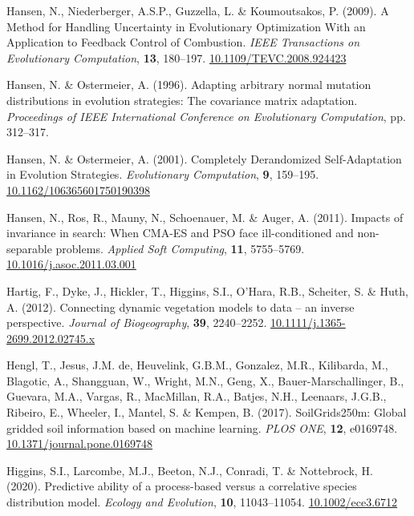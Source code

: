 \documentclass[11pt,]{article}
\newlength{\cslhangindent}
\newenvironment{CSLReferences}[2] %
 {%
  \setlength{\parindent}{0pt}
  \ifodd #1 \everypar{\setlength{\hangindent}{\cslhangindent}}\ignorespaces\fi
  \ifnum #2 > 0
  \setlength{\parskip}{#2\baselineskip}
  \fi
 }%
 {}
\begin{document}
\begin{CSLReferences}{1}{0}
\leavevmode{}%
Hansen, N., Niederberger, A.S.P., Guzzella, L. \& Koumoutsakos, P.
(2009). A {Method} for {Handling} {Uncertainty} in {Evolutionary}
{Optimization} {With} an {Application} to {Feedback} {Control} of
{Combustion}. \emph{IEEE Transactions on Evolutionary Computation},
\textbf{13}, 180--197.
\href{https://doi.org/10.1109/TEVC.2008.924423}{10.1109/TEVC.2008.924423}

\leavevmode{}%
Hansen, N. \& Ostermeier, A. (1996). Adapting arbitrary normal mutation
distributions in evolution strategies: The covariance matrix adaptation.
\emph{Proceedings of {IEEE} {International} {Conference} on
{Evolutionary} {Computation}}, pp. 312--317.

\leavevmode{}%
Hansen, N. \& Ostermeier, A. (2001). Completely {Derandomized}
{Self}-{Adaptation} in {Evolution} {Strategies}. \emph{Evolutionary
Computation}, \textbf{9}, 159--195.
\href{https://doi.org/10.1162/106365601750190398}{10.1162/106365601750190398}

\leavevmode{}%
Hansen, N., Ros, R., Mauny, N., Schoenauer, M. \& Auger, A. (2011).
Impacts of invariance in search: {When} {CMA}-{ES} and {PSO} face
ill-conditioned and non-separable problems. \emph{Applied Soft
Computing}, \textbf{11}, 5755--5769.
\href{https://doi.org/10.1016/j.asoc.2011.03.001}{10.1016/j.asoc.2011.03.001}

\leavevmode{}%
Hartig, F., Dyke, J., Hickler, T., Higgins, S.I., O'Hara, R.B.,
Scheiter, S. \& Huth, A. (2012). Connecting dynamic vegetation models to
data -- an inverse perspective. \emph{Journal of Biogeography},
\textbf{39}, 2240--2252.
\href{https://doi.org/10.1111/j.1365-2699.2012.02745.x}{10.1111/j.1365-2699.2012.02745.x}

\leavevmode{}%
Hengl, T., Jesus, J.M. de, Heuvelink, G.B.M., Gonzalez, M.R., Kilibarda,
M., Blagotic, A., Shangguan, W., Wright, M.N., Geng, X.,
Bauer-Marschallinger, B., Guevara, M.A., Vargas, R., MacMillan, R.A.,
Batjes, N.H., Leenaars, J.G.B., Ribeiro, E., Wheeler, I., Mantel, S. \&
Kempen, B. (2017). {SoilGrids250m}: {Global} gridded soil information
based on machine learning. \emph{PLOS ONE}, \textbf{12}, e0169748.
\href{https://doi.org/10.1371/journal.pone.0169748}{10.1371/journal.pone.0169748}

\leavevmode{}%
Higgins, S.I., Larcombe, M.J., Beeton, N.J., Conradi, T. \& Nottebrock,
H. (2020). Predictive ability of a process-based versus a correlative
species distribution model. \emph{Ecology and Evolution}, \textbf{10},
11043--11054.
\href{https://doi.org/10.1002/ece3.6712}{10.1002/ece3.6712}


\end{CSLReferences}
\end{document}
